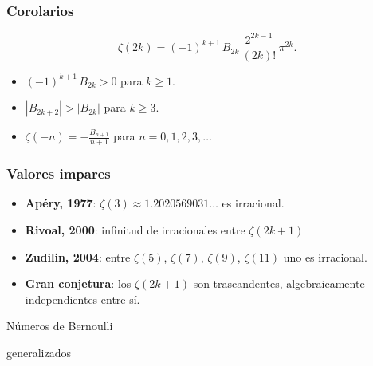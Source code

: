 \documentclass{beamer}
\begin{document}

\begin{frame}
  \frametitle{Corolarios}

  \[ \zeta (2k) = (-1)^{k+1} \, B_{2k}\,\frac{2^{2k-1}}{(2k)!}\,\pi^{2k}. \]

  \begin{itemize}
  \item<2-> $(-1)^{k+1}\,B_{2k} > 0$ para $k \ge 1$.

  \item<3-> $|B_{2k+2}| > |B_{2k}|$ para $k \ge 3$.

  \item<4-> $\zeta (-n) = -\frac{B_{n+1}}{n+1}$ para $n = 0,1,2,3,\ldots$
  \end{itemize}
\end{frame}


\begin{frame}
  \frametitle{Valores impares}

  \begin{itemize}
  \item<1-> \textbf{Apéry, 1977}:
    $\zeta (3) \approx 1.2020569031\ldots$
    es irracional.

  \item<2-> \textbf{Rivoal, 2000}:
    infinitud de irracionales entre $\zeta (2k+1)$

  \item<3-> \textbf{Zudilin, 2004}:
    entre $\zeta(5)$, $\zeta(7)$, $\zeta(9)$, $\zeta(11)$ uno es irracional.

  \item<4-> \textbf{Gran conjetura}: los $\zeta (2k+1)$ son trascandentes,
    algebraicamente independientes entre sí.
  \end{itemize}
\end{frame}


\begin{frame}[plain]
  \headingfont

  \begin{center}
    {\huge Números de Bernoulli

      generalizados

    }
  \end{center}
\end{frame}
\end{document}
